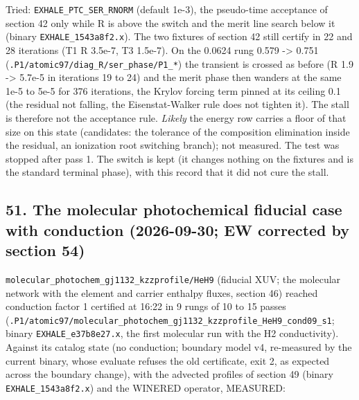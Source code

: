 \documentclass[english,a4paper]{my_memo}
\begin{document}
Tried: \texttt{EXHALE\_PTC\_SER\_RNORM} (default 1e-3), the pseudo-time acceptance of
section 42 only while \textbar\textbar R\textbar\textbar{} is above the switch and the merit line search
below it (binary \texttt{EXHALE\_1543a8f2.x}). The two fixtures of section 42 still
certify in 22 and 28 iterations (T1 \textbar\textbar R\textbar\textbar{} 3.5e-7, T3 1.5e-7). On the 0.0624
rung 0.579 -\textgreater{} 0.751 (\texttt{.P1/atomic97/diag\_R/ser\_phase/P1\_*}) the transient is
crossed as before (\textbar\textbar R\textbar\textbar{} 1.9 -\textgreater{} 5.7e-5 in iterations 19 to 24) and the
merit phase then wanders at the same 1e-5 to 5e-5 for 376 iterations, the
Krylov forcing term pinned at its ceiling 0.1 (the residual not falling,
the Eisenstat-Walker rule does not tighten it). The stall is therefore not
the acceptance rule. \emph{Likely} the energy row carries a floor of that size on
this state (candidates: the tolerance of the composition elimination inside
the residual, an ionization root switching branch); not measured. The test
was stopped after pass 1. The switch is kept (it changes nothing on the
fixtures and is the standard terminal phase), with this record that it did
not cure the stall.

\subsection{51. The molecular photochemical fiducial case with conduction (2026-09-30; EW corrected by section 54)}\label{51-the-molecular-photochemical-fiducial-case-with-conduction-2026-09-30-ew-corrected-by-section-54}

\texttt{molecular\_photochem\_gj1132\_kzzprofile/HeH9} (fiducial XUV; the molecular
network with the element and carrier enthalpy fluxes, section 46) reached
conduction factor 1 certified at 16:22 in 9 rungs of 10 to 15 passes
(\texttt{.P1/atomic97/molecular\_photochem\_gj1132\_kzzprofile\_HeH9\_cond09\_s1}; binary
\texttt{EXHALE\_e37b8e27.x}, the first molecular run with the H2 conductivity).
Against its catalog state (no conduction; boundary model v4, re-measured by
the current binary, whose evaluate refuses the old certificate, exit 2, as
expected across the boundary change), with the advected profiles of section
49 (binary \texttt{EXHALE\_1543a8f2.x}) and the WINERED operator, MEASURED:
\end{document}
